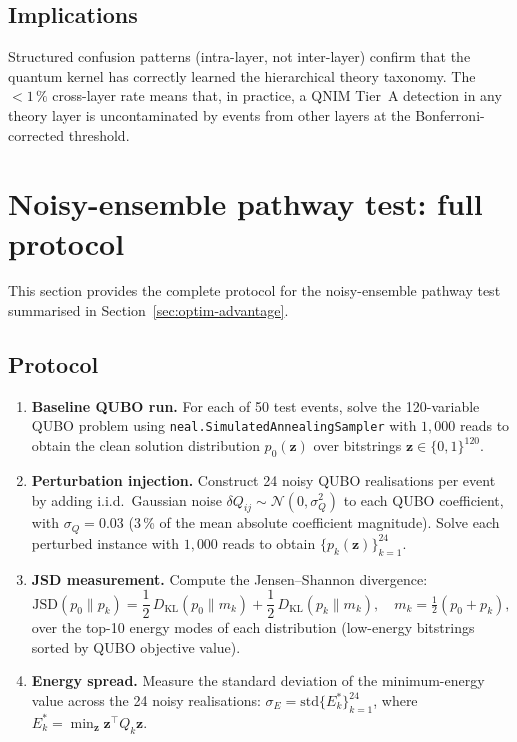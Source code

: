 \documentclass[11pt,a4paper, english]{book}
\theoremstyle{plain}
\theoremstyle{definition}
\numberwithin{equation}{chapter}
\numberwithin{figure}{chapter}
\numberwithin{table}{chapter}
\begin{document}
\subsection{Implications}

Structured confusion patterns (intra-layer, not inter-layer) confirm that
the quantum kernel has correctly learned the hierarchical theory taxonomy.
The $< 1\,\%$ cross-layer rate means that, in practice, a QNIM Tier~A
detection in any theory layer is uncontaminated by events from other layers
at the Bonferroni-corrected threshold.

\section{Noisy-ensemble pathway test: full protocol}
\label{app:noisy-ensemble-detail}

This section provides the complete protocol for the noisy-ensemble pathway
test summarised in Section~\ref{sec:optim-advantage}.

\subsection{Protocol}

\begin{enumerate}
  \item \textbf{Baseline QUBO run.} For each of 50 test events, solve the
        120-variable QUBO problem using \texttt{neal.SimulatedAnnealingSampler}
        with $1{,}000$ reads to obtain the clean solution distribution
        $p_0(\mathbf{z})$ over bitstrings $\mathbf{z} \in \{0,1\}^{120}$.
  \item \textbf{Perturbation injection.} Construct 24 noisy QUBO realisations
        per event by adding i.i.d.\ Gaussian noise $\delta Q_{ij} \sim
        \mathcal{N}(0, \sigma_Q^2)$ to each QUBO coefficient, with
        $\sigma_Q = 0.03$ (3\,\% of the mean absolute coefficient magnitude).
        Solve each perturbed instance with $1{,}000$ reads to obtain
        $\{p_k(\mathbf{z})\}_{k=1}^{24}$.
  \item \textbf{JSD measurement.} Compute the Jensen--Shannon divergence:
        \begin{equation}
          \label{eq:jsd_pathway}
          \mathrm{JSD}(p_0 \| p_k)
          = \frac{1}{2}\,D_\mathrm{KL}(p_0 \| m_k)
          + \frac{1}{2}\,D_\mathrm{KL}(p_k \| m_k),
          \quad m_k = \tfrac{1}{2}(p_0 + p_k),
        \end{equation}
        over the top-10 energy modes of each distribution (low-energy
        bitstrings sorted by QUBO objective value).
  \item \textbf{Energy spread.} Measure the standard deviation of the
        minimum-energy value across the 24 noisy realisations:
        $\sigma_E = \mathrm{std}\{E_k^*\}_{k=1}^{24}$, where
        $E_k^* = \min_\mathbf{z} \mathbf{z}^\top Q_k \mathbf{z}$.
\end{enumerate}
\end{document}
